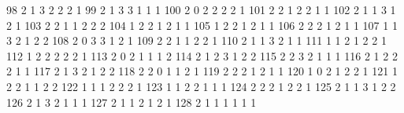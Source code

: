 \documentclass[
  letterpaper,
  DIV=11,
  numbers=noendperiod]{scrreprt}
\newenvironment{Shaded}{\begin{snugshade}}{\end{snugshade}}
\newcommand{\NormalTok}[1]{\textcolor[rgb]{0.00,0.23,0.31}{#1}}
\begin{document}
\begin{Shaded}
\begin{Highlighting}[]
\NormalTok{98               2     1         3            2        2         2      1}
\NormalTok{99               2     1         3            3        1         1      1}
\NormalTok{100              2     0         2            2        2         2      1}
\NormalTok{101              2     2         1            2        2         1      1}
\NormalTok{102              2     1         1            3        1         2      1}
\NormalTok{103              2     2         1            1        2         2      2}
\NormalTok{104              1     2         2            1        2         1      1}
\NormalTok{105              1     2         2            1        2         1      1}
\NormalTok{106              2     2         2            1        2         1      1}
\NormalTok{107              1     1         3            2        1         2      2}
\NormalTok{108              2     0         3            3        1         2      1}
\NormalTok{109              2     2         1            1        2         2      1}
\NormalTok{110              2     1         1            3        2         1      1}
\NormalTok{111              1     1         2            1        2         2      1}
\NormalTok{112              1     2         2            2        2         2      1}
\NormalTok{113              2     0         2            1        1         1      2}
\NormalTok{114              2     1         2            3        1         2      2}
\NormalTok{115              2     2         3            2        1         1      1}
\NormalTok{116              2     1         2            2        2         1      1}
\NormalTok{117              2     1         3            2        1         2      2}
\NormalTok{118              2     2         0            1        1         2      1}
\NormalTok{119              2     2         2            1        2         1      1}
\NormalTok{120              1     0         2            1        2         2      1}
\NormalTok{121              1     2         2            1        1         2      2}
\NormalTok{122              1     1         1            2        2         2      1}
\NormalTok{123              1     1         2            2        1         1      1}
\NormalTok{124              2     2         2            1        2         2      1}
\NormalTok{125              2     1         1            3        1         2      2}
\NormalTok{126              2     1         3            2        1         1      1}
\NormalTok{127              2     1         1            2        1         2      1}
\NormalTok{128              2     1         1            1        1         1      1}

\end{Highlighting}
\end{Shaded}
\end{document}
